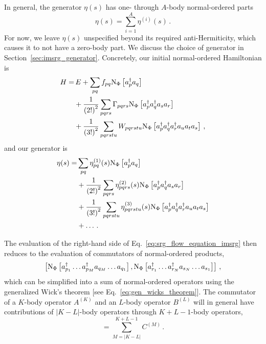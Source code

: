 In general, the generator $\eta(s)$ has one- through $A$-body normal-ordered parts
\begin{equation}
  \eta(s) = \sum_{i=1}^A \eta^{(i)}(s)\,.
\end{equation}
For now, we leave $\eta(s)$ unspecified beyond its required anti-Hermiticity,
which causes it to not have a zero-body part.
We discuss the choice of generator in Section~\ref{sec:imsrg_generator}.
Concretely, our initial normal-ordered Hamiltonian is
\begin{equation}
  \begin{split}
    H = &\,E
    + \sum_{pq} f_{pq} \text{N}_{\Phi}\left[a_{p}^{\dagger} a_{q}\right] \\
    &+ \frac{1}{{(2!)}^2} \sum_{pqrs} \Gamma_{pqrs} \text{N}_{\Phi}\left[a_{p}^{\dagger} a_{q}^{\dagger} a_{s} a_{r}\right]\\
    &+ \frac{1}{{(3!)}^2} \sum_{pqrstu} W_{pqrstu} \text{N}_{\Phi}\left[a_{p}^{\dagger} a_{q}^{\dagger} a_{r}^{\dagger} a_{u} a_{t} a_{s}\right]\,,
  \end{split}
\end{equation}
and our generator is
\begin{equation}
  \begin{split}
    \eta(s) = &
    \sum_{pq} \eta^{(1)}_{pq}(s) \text{N}_{\Phi}\left[a_{p}^{\dagger} a_{q}\right] \\
    &+ \frac{1}{{(2!)}^2} \sum_{pqrs} \eta^{(2)}_{pqrs}(s) \text{N}_{\Phi}\left[a_{p}^{\dagger} a_{q}^{\dagger} a_{s} a_{r}\right]\\
    &+ \frac{1}{{(3!)}^2} \sum_{pqrstu} \eta^{(3)}_{pqrstu}(s) \text{N}_{\Phi}\left[a_{p}^{\dagger} a_{q}^{\dagger} a_{r}^{\dagger} a_{u} a_{t} a_{s}\right]\\
    &+ \ldots \,.
  \end{split}
\end{equation}

The evaluation of the right-hand side of Eq.~\eqref{eq:srg_flow_equation_imsrg} then reduces to
the evaluation of commutators of normal-ordered products,
\begin{equation}
  \left[\text{N}_{\Phi}\left[a_{p_1}^{\dagger} \ldots a_{p_M}^{\dagger} a_{q_M} \ldots a_{q_1}\right],
    \text{N}_{\Phi}\left[a_{r_1}^{\dagger} \ldots a_{r_N}^{\dagger} a_{s_N} \ldots a_{s_1}\right]\right]\,,
\end{equation}
which can be simplified into a sum of normal-ordered operators
using the generalized Wick's theorem [see Eq.~\eqref{eq:gen_wicks_theorem}].
The commutator of a $K$-body operator $A^{(K)}$ and an $L$-body operator $B^{(L)}$
will in general have contributions of $|K-L|$-body operators through $K+L-1$-body operators,
\begin{equation}
  [A^{(K)}, B^{(L)}] = \sum_{M=|K-L|}^{K+L-1}C^{(M)}\,.
\end{equation}

